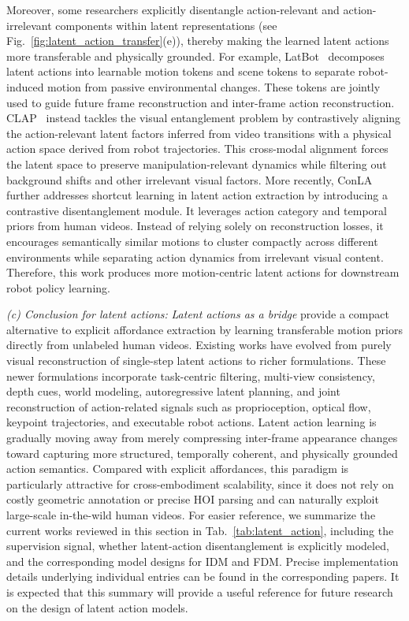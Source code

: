 \documentclass[Afour,sageh,times]{sagej}
\begin{document}
Moreover, some researchers explicitly disentangle action-relevant and action-irrelevant components within latent representations (see Fig.~\ref{fig:latent_action_transfer}(e)), thereby making the learned latent actions more transferable and physically grounded. For example, LatBot~\citep{li2025latbot} decomposes latent actions into learnable motion tokens and scene tokens to separate robot-induced motion from passive environmental changes. These tokens are jointly used to guide future frame reconstruction and inter-frame action reconstruction. CLAP~\citep{zhang2026clap} instead tackles the visual entanglement problem by contrastively aligning the action-relevant latent factors inferred from video transitions with a physical action space derived from robot trajectories. This cross-modal alignment forces the latent space to preserve manipulation-relevant dynamics while filtering out background shifts and other irrelevant visual factors. More recently, ConLA~\citep{dai2026conla} further addresses shortcut learning in latent action extraction by introducing a contrastive disentanglement module. It leverages action category and temporal priors from human videos. Instead of relying solely on reconstruction losses, it encourages semantically similar motions to cluster compactly across different environments while separating action dynamics from irrelevant visual content. Therefore, this work produces more motion-centric latent actions for downstream robot policy learning.





\textit{(c) Conclusion for latent actions:} \textit{Latent actions as a bridge} provide a compact alternative to explicit affordance extraction by learning transferable motion priors directly from unlabeled human videos. Existing works have evolved from purely visual reconstruction of single-step latent actions to richer formulations. These newer formulations incorporate task-centric filtering, multi-view consistency, depth cues, world modeling, autoregressive latent planning, and joint reconstruction of action-related signals such as proprioception, optical flow, keypoint trajectories, and executable robot actions. Latent action learning is gradually moving away from merely compressing inter-frame appearance changes toward capturing more structured, temporally coherent, and physically grounded action semantics. Compared with explicit affordances, this paradigm is particularly attractive for cross-embodiment scalability, since it does not rely on costly geometric annotation or precise HOI parsing and can naturally exploit large-scale in-the-wild human videos. For easier reference, we summarize the current works reviewed in this section in Tab.~\ref{tab:latent_action}, including the supervision signal, whether latent-action disentanglement is explicitly modeled, and the corresponding model designs for IDM and FDM. Precise implementation details underlying individual entries can be found in the corresponding papers. It is expected that this summary will provide a useful reference for future research on the design of latent action models.
\end{document}

